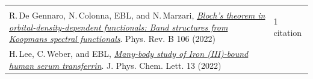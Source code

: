 \documentclass[10pt,a4paper,final]{article}
\begin{document}
\begin{tabularx}{\textwidth}{
      m{}%
      m{}}
   \rowcolor{seaborn_blue}
   \multicolumn{2}{l}{\large\textcolor{seaborn_bg_grey_half}{\textbf{Publications}}}                                                                                                                                                                                                                                                                                                                                                                                                                                                                                                                                                                                                                                                                                                                            \\
   R.\,De Gennaro, N.\,Colonna, EBL, and N.\,Marzari, \href{https://doi.org/10.1103/PhysRevB.106.035106}{\textit{Bloch's theorem in orbital-density-dependent functionals: Band structures from Koopmans spectral functionals}}. Phys. Rev. B 106 (2022)                                                                                                                                                                                                                                                                                                                                                                                                                                                                                                      & 1 citation                                      \\
   H.\,Lee, C.\,Weber, and EBL, \href{https://doi.org/10.1021/acs.jpclett.2c00680}{\textit{Many-body study of Iron (III)-bound human serum transferrin}}. J. Phys. Chem. Lett. 13 (2022)                                                                                                                                                                                                                                                                                                                                                                                                                                                                                                                                                                      &                                                 \\

\end{tabularx}
\end{document}
